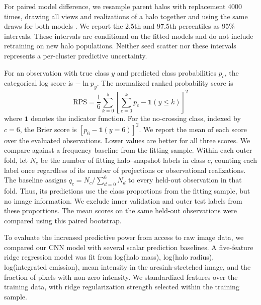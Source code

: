 For paired model difference, we resample parent halos with replacement 4000 times, drawing all views and realizations of a halo together and using the same draws for both models \citep{EfronTibshirani1993, DavisonHinkley1997}.
We report the 2.5th and 97.5th percentiles as 95\% intervals.
These intervals are conditional on the fitted models and do not include retraining on new halo populations.
Neither seed scatter nor these intervals represents a per-cluster predictive uncertainty.

For an observation with true class $y$ and predicted class probabilities $p_c$, the categorical log score is $-\ln p_y$.
The normalized ranked probability score is
\begin{equation}
    \text{RPS} = \frac{1}{6} \sum_{k=0}^5 \left[ \sum_{c=0}^k p_c - \mathbf{1}(y \leq k) \right]^2
\end{equation}
where $\mathbf{1}$ denotes the indicator function.
For the no-crossing class, indexed by $c=6$, the Brier score is $[p_6-\mathbf{1}(y=6)]^2$.
We report the mean of each score over the evaluated observations.
Lower values are better for all three scores.
We compare against a frequency baseline from the fitting sample.
Within each outer fold, let $N_c$ be the number of fitting halo--snapshot labels in class $c$, counting each label once regardless of its number of projections or observational realizations.
The baseline assigns $q_c=N_c/\sum_{d=0}^{6}N_d$ to every held-out observation in that fold.
Thus, its predictions use the class proportions from the fitting sample, but no image information.
We exclude inner validation and outer test labels from these proportions.
The mean scores on the same held-out observations were compared using this paired bootstrap.

To evaluate the increased predictive power from access to raw image data, we compared our CNN model with several scalar prediction baselines.
A five-feature ridge regression model was fit from log(halo mass), log(halo radius), log(integrated emission), mean intensity in the arcsinh-stretched image, and the fraction of pixels with non-zero intensity.
We standardized features over the training data, with ridge regularization strength selected within the training sample.

